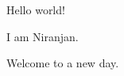 \documentclass{article}
\begin{document}
Hello world!\hfill{}

I am Niranjan.\hfill{}

Welcome to a new day.\hfill{}
\end{document}
